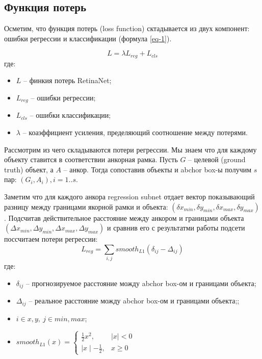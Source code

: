 \subsection{Функция потерь}

Осметим, что функция потерь (loss function) сктадывается из двух компонент: ошибки регрессии и классификации (формула \ref{eq-1}).

\begin{equation}\label{eq-1}
    L = \lambda L_{reg}+L_{cls}
\end{equation}
где:
\begin{itemize}
    \item $L$ -- финкия потерь RetinaNet;
    \item $L_{reg}$ -- ошибки регрессии;
    \item $L_{cls}$ -- ошибки классификации;
    \item $\lambda$ -- коаэффициент усиления, пределяющий соотношение между потерями.
\end{itemize}

Рассмотрим из чего складываются потери регрессии. Мы знаем что для каждому объекту ставится в соответствии анкорная рамка. Пусть $G$ -- целевой (ground truth) объект, а $A$ -- анкор. Тогда сопоставив объекты и abchor box-ы получим $s$ пар: $(G_i, A_i), i=1..s$.

Заметим что для каждого анкора regression subnet отдает вектор показывающий разницу между границами якорной рамки и объекта: $(\delta x_{min}, \delta y_{min}, \delta x_{max}, \delta y_{max})$. Подсчитав действительное расстояние между анкором и границами объекта  $(\Delta x_{min}, \Delta y_{min}, \Delta x_{max}, \Delta y_{max})$ и сравнив его с результатми работы подсети поссчитаем потери регрессии:
$$
L_{reg} = \sum_{i, j} smooth_{L1}(\delta_{ij}-\Delta_{ij})
$$
где:
\begin{itemize}
    \item $\delta_{ij}$ -- прогнозируемое расстояние можду abchor box-ом и границами объекта;
    \item $\Delta_{ij}$ -- реальное расстояние можду abchor box-ом и границами объекта;;
    \item $i \in {x, y},\ j \in {min, max}$;
    \item $smooth_{L1}(x) = \begin{cases}\frac{1}{2}x^2, & \mid x\mid < 0\\\mid x\mid - \frac{1}{2}, & x \geq 0\end{cases}$
\end{itemize}


